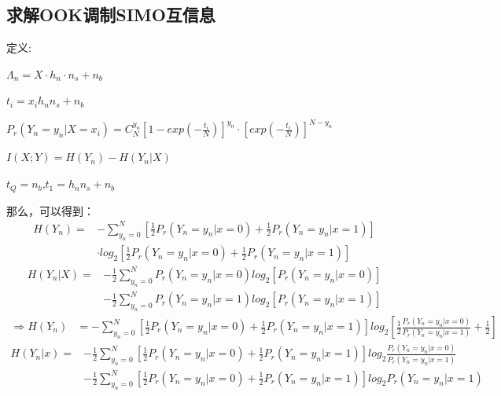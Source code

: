 \documentclass[12pt]{article}
\begin{document}
\subsection{求解OOK调制SIMO互信息}
定义:\par$\Lambda_n=X·h_n·n_s+n_b$\par$t_i=x_ih_nn_s+n_b$\par$P_r(Y_n=y_n|X=x_i)=C_N^{y_n}\left[1-exp\left(-\frac{t_i}{N}\right)\right]^{y_n}·\left[exp\left(-\frac{t_i}{N}\right)\right]^{N-y_n}$\par$I(X;Y)=H(Y_n)-H(Y_n|X)$\par$t_Q=n_b$,$t_1=h_nn_s+n_b$\par
那么，可以得到：
\begin{equation*}
    \begin{aligned}
      H(Y_n)=&-\sum\limits_{y_n=0}^N\left[\frac{1}{2}P_r(Y_n=y_n|x=0)+\frac{1}{2}P_r(Y_n=y_n|x=1)\right] \\
      &·log_2\left[\frac{1}{2}P_r(Y_n=y_n|x=0)+\frac{1}{2}P_r(Y_n=y_n|x=1)\right]
    \end{aligned}
\end{equation*}
\begin{equation*}
    \begin{aligned}
      H(Y_n|X)=&-\frac{1}{2}\sum\limits_{y_n=0}^NP_r(Y_n=y_n|x=0)log_2[P_r(Y_n=y_n|x=0)] \\
      &-\frac{1}{2}\sum\limits_{y_n=0}^NP_r(Y_n=y_n|x=1)log_2[P_r(Y_n=y_n|x=1)]
    \end{aligned}
\end{equation*}
\begin{equation*}
    \begin{aligned}
      \Rightarrow H(Y_n)&=-\sum\limits_{y_n=0}^N\left[\frac{1}{2}P_r(Y_n=y_n|x=0)+\frac{1}{2}P_r(Y_n=y_n|x=1)\right]log_2\left[\frac{1}{2}\frac{P_r(Y_n=y_n|x=0)}{P_r(Y_n=y_n|x=1)}+\frac{1}{2}\right]
    \end{aligned}
\end{equation*}
\begin{equation*}
    \begin{aligned}
       H(Y_n|x)=&-\frac{1}{2}\sum\limits_{y_n=0}^N\left[\frac{1}{2}P_r(Y_n=y_n|x=0)+\frac{1}{2}P_r(Y_n=y_n|x=1)\right]log_2\frac{P_r(Y_n=y_n|x=0)}{P_r(Y_n=y_n|x=1)}\\
       &-\frac{1}{2}\sum\limits_{y_n=0}^N\left[\frac{1}{2}P_r(Y_n=y_n|x=0)+\frac{1}{2}P_r(Y_n=y_n|x=1)\right]log_2P_r(Y_n=y_n|x=1)
    \end{aligned}
\end{equation*}
\end{document}
